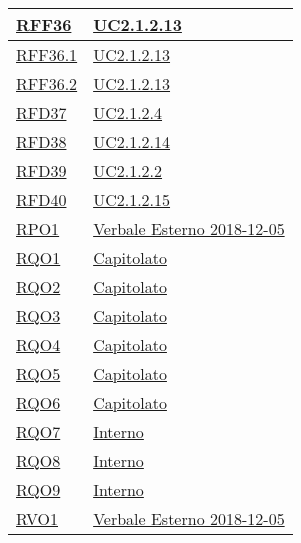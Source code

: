 \begin{longtable}{|>{\centering}m{5cm}|m{5cm}<{\centering}|}
	\hyperlink{RFF36}{RFF36} & \hyperref[UC2.1.2.13]{UC2.1.2.13}\\ \hline
	
	\hyperlink{RFF36.1}{RFF36.1} & \hyperref[UC2.1.2.13]{UC2.1.2.13}\\ \hline
	
	\hyperlink{RFF36.2}{RFF36.2} & \hyperref[UC2.1.2.13]{UC2.1.2.13}\\ \hline
	
	\hyperlink{RFD37}{RFD37} & \hyperref[UC2.1.2.4]{UC2.1.2.4}\\ \hline
	
	\hyperlink{RFD38}{RFD38} & \hyperref[UC2.1.2.14]{UC2.1.2.14}\\ \hline
	
	\hyperlink{RFD39}{RFD39} & \hyperref[UC2.1.2.2]{UC2.1.2.2}\\ \hline
	
	\hyperlink{RFD40}{RFD40} & \hyperref[UC2.1.2.15]{UC2.1.2.15}\\ \hline
	
	\hyperlink{RPO1}{RPO1} & \hyperref[Verbale Esterno 2018-12-05]{Verbale Esterno 2018-12-05}\\ \hline
	
	\hyperlink{RQO1}{RQO1} & \hyperref[Capitolato]{Capitolato}\\ \hline
	
	\hyperlink{RQO2}{RQO2} & \hyperref[Capitolato]{Capitolato}\\ \hline
	
	\hyperlink{RQO3}{RQO3} & \hyperref[Capitolato]{Capitolato}\\ \hline
	
	\hyperlink{RQO4}{RQO4} & \hyperref[Capitolato]{Capitolato}\\ \hline
	
	\hyperlink{RQO5}{RQO5} & \hyperref[Capitolato]{Capitolato}\\ \hline
	
	\hyperlink{RQO6}{RQO6} & \hyperref[Capitolato]{Capitolato}\\ \hline
	
	\hyperlink{RQO7}{RQO7} & \hyperref[Interno]{Interno}\\ \hline
	
	\hyperlink{RQO8}{RQO8} & \hyperref[Interno]{Interno}\\ \hline
	
	\hyperlink{RQO9}{RQO9} & \hyperref[Interno]{Interno}\\ \hline
	
	\hyperlink{RVO1}{RVO1} & \hyperref[Verbale Esterno 2018-12-05]{Verbale Esterno 2018-12-05}\\ \hline
	

\end{longtable}
